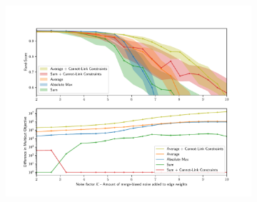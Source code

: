 % 

\begin{figure}
\centering
        \begin{subfigure}[t]{0.49 \textwidth}
        \centering
        \includegraphics[width=\textwidth,trim=0.55in 0.35in 0.65in 0.80in,clip]{./figs/merge_noise_only_direct.pdf}


\end{subfigure}
\end{figure}
